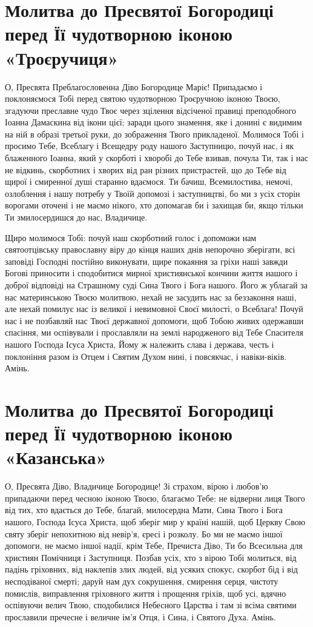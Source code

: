 \documentclass[chapters.tex]{subfiles}
\begin{document}
\section{Молитва до Пресвятої Богородиці перед Її чудотворною іконою «Троєручиця»}
О, Пресвята Преблагословенна Діво Богородице Маріє! Припадаємо і поклоняємося Тобі перед святою чудотворною Троєручною іконою Твоєю, згадуючи преславне чудо Твоє через зцілення відсіченої правиці преподобного Іоанна Дамаскина від ікони цієї; заради цього знамення, яке і донині є видимим на ній в образі третьої руки, до зображення Твого прикладеної. Молимося Тобі і просимо Тебе, Всеблагу і Всещедру роду нашого Заступницю, почуй нас, і як блаженного Іоанна, який у скорботі і хворобі до Тебе взивав, почула Ти, так і нас не відкинь, скорботних і хворих від ран різних пристрастей, що до Тебе від щирої і смиренної душі старанно вдаємося. Ти бачиш, Всемилостива, немочі, озлоблення і нашу потребу у Твоїй допомозі і заступництві, бо ми з усіх сторін ворогами оточені і не маємо нікого, хто допомагав би і захищав би, якщо тільки Ти змилосердишся до нас, Владичице.

Щиро молимося Тобі: почуй наш скорботний голос і допоможи нам святоотцівську православну віру до кінця наших днів непорочно зберігати, всі заповіді Господні постійно виконувати, щире покаяння за гріхи наші завжди Богові приносити і сподобитися мирної християнської кончини життя нашого і доброї відповіді на Страшному суді Сина Твого і Бога нашого. Його ж ублагай за нас материнською Твоєю молитвою, нехай не засудить нас за беззаконня наші, але нехай помилує нас із великої і невимовної Своєї милості, о Всеблага! Почуй нас і не позбавляй нас Твоєї державної допомоги, щоб Тобою живих одержавши спасіння, ми оспівували і прославляли на землі народженого від Тебе Спасителя нашого Господа Ісуса Христа, Йому ж належить слава і держава, честь і поклоніння разом із Отцем і Святим Духом нині, і повсякчас, і навіки-віків. Амінь.

\section{Молитва до Пресвятої Богородиці перед Її чудотворною іконою «Казанська»}
О, Пресвята Діво, Владичице Богородице! Зі страхом, вірою і любов’ю припадаючи перед чесною іконою Твоєю, благаємо Тебе: не відверни лиця Твого від тих, хто вдається до Тебе, благай, милосердна Мати, Сина Твого і Бога нашого, Господа Ісуса Христа, щоб зберіг мир у країні нашій, щоб Церкву Свою святу зберіг непохитною від невір’я, єресі і розколу. Бо ми не маємо іншої допомоги, не маємо іншої надії, крім Тебе, Пречиста Діво, Ти бо Всесильна для християн Помічниця і Заступниця. Позбав усіх, хто з вірою Тобі молиться, від падінь гріховних, від наклепів злих людей, від усяких спокус, скорбот бід і від несподіваної смерті; даруй нам дух сокрушення, смирення серця, чистоту помислів, виправлення гріховного життя і прощення гріхів, щоб усі, вдячно оспівуючи велич Твою, сподобилися Небесного Царства і там зі всіма святими прославили пречесне і величне ім’я Отця, і Сина, і Святого Духа. Амінь.
\end{document}
